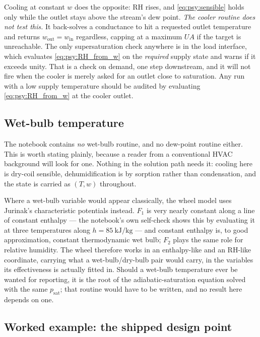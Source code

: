 \documentclass[11pt]{article}
\newcommand{\UA}{\ensuremath{U\!A}}
\newcommand{\psat}{\ensuremath{p_{\mathrm{sat}}}}
\newcommand{\RH}{\ensuremath{\mathrm{RH}}}
\begin{document}
Cooling at constant $w$ does the opposite: $\RH$ rises, and \eqref{eq:psy:sensible} holds only while
the outlet stays above the stream's dew point. \emph{The cooler routine does not test this.} It
back-solves a conductance to hit a requested outlet temperature and returns $w_{\mathrm{out}} =
w_{\mathrm{in}}$ regardless, capping at a maximum $\UA$ if the target is unreachable. The only
supersaturation check anywhere is in the load interface, which evaluates \eqref{eq:psy:RH_from_w} on
the \emph{required} supply state and warns if it exceeds unity. That is a check on demand, one step
downstream, and it will not fire when the cooler is merely asked for an outlet close to saturation.
Any run with a low supply temperature should be audited by evaluating \eqref{eq:psy:RH_from_w} at
the cooler outlet.

\subsection{Wet-bulb temperature}
\label{sec:psy:wetbulb}

The notebook contains \emph{no} wet-bulb routine, and no dew-point routine either. This is worth
stating plainly, because a reader from a conventional HVAC background will look for one. Nothing in
the solution path needs it: cooling here is dry-coil sensible, dehumidification is by sorption
rather than condensation, and the state is carried as $(T,w)$ throughout.

Where a wet-bulb variable would appear classically, the wheel model uses Jurinak's characteristic
potentials instead. $F_1$ is very nearly constant along a line of constant enthalpy --- the
notebook's own self-check shows this by evaluating it at three temperatures along $h =
\SI{85}{\kilo\joule\per\kilogram}$ --- and constant enthalpy is, to good approximation, constant
thermodynamic wet bulb; $F_2$ plays the same role for relative humidity. The wheel therefore works
in an enthalpy-like and an $\RH$-like coordinate, carrying what a wet-bulb/dry-bulb pair would
carry, in the variables its effectiveness is actually fitted in. Should a wet-bulb temperature ever
be wanted for reporting, it is the root of the adiabatic-saturation equation solved with the same
$\psat$; that routine would have to be written, and no result here depends on one.

\subsection{Worked example: the shipped design point}
\label{sec:psy:example}
\end{document}
